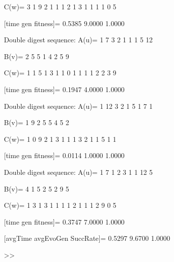 C(w)=
     3     1     9     2     1     1     1     2     1     3     1     1     1     1     0     5

[time gen fitness]=
    0.5385    9.0000    1.0000

Double digest sequence:
A(u)=
     1     7     3     2     1     1     1     5    12

B(v)=
     2     5     5     1     4     2     5     9

C(w)=
     1     1     5     1     3     1     1     0     1     1     1     1     2     2     3     9

[time gen fitness]=
    0.1947    4.0000    1.0000

Double digest sequence:
A(u)=
     1    12     3     2     1     5     1     7     1

B(v)=
     1     9     2     5     5     4     5     2

C(w)=
     1     0     9     2     1     3     1     1     1     3     2     1     1     5     1     1

[time gen fitness]=
    0.0114    1.0000    1.0000

Double digest sequence:
A(u)=
     1     7     1     2     3     1     1    12     5

B(v)=
     4     1     5     2     5     2     9     5

C(w)=
     1     3     1     3     1     1     1     1     2     1     1     1     2     9     0     5

[time gen fitness]=
    0.3747    7.0000    1.0000

[avgTime  avgEvoGen  SuccRate]=
    0.5297    9.6700    1.0000

>> 